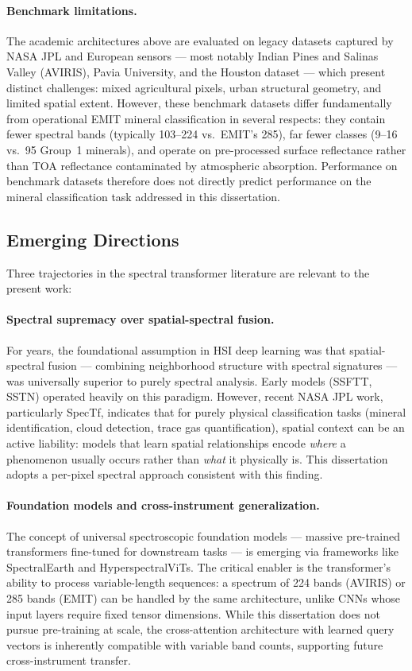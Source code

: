 \documentclass[11pt]{report}
\begin{document}
\paragraph{Benchmark limitations.}
The academic architectures above are evaluated on legacy datasets captured by NASA JPL and European sensors --- most notably Indian Pines and Salinas Valley (AVIRIS), Pavia University, and the Houston dataset --- which present distinct challenges: mixed agricultural pixels, urban structural geometry, and limited spatial extent. However, these benchmark datasets differ fundamentally from operational EMIT mineral classification in several respects: they contain fewer spectral bands (typically 103--224 vs.\ EMIT's 285), far fewer classes (9--16 vs.\ 95 Group~1 minerals), and operate on pre-processed surface reflectance rather than TOA reflectance contaminated by atmospheric absorption. Performance on benchmark datasets therefore does not directly predict performance on the mineral classification task addressed in this dissertation.

\subsection{Emerging Directions}

Three trajectories in the spectral transformer literature are relevant to the present work:

\paragraph{Spectral supremacy over spatial-spectral fusion.}
For years, the foundational assumption in HSI deep learning was that spatial-spectral fusion --- combining neighborhood structure with spectral signatures --- was universally superior to purely spectral analysis. Early models (SSFTT, SSTN) operated heavily on this paradigm. However, recent NASA JPL work, particularly SpecTf, indicates that for purely physical classification tasks (mineral identification, cloud detection, trace gas quantification), spatial context can be an active liability: models that learn spatial relationships encode \emph{where} a phenomenon usually occurs rather than \emph{what} it physically is. This dissertation adopts a per-pixel spectral approach consistent with this finding.

\paragraph{Foundation models and cross-instrument generalization.}
The concept of universal spectroscopic foundation models --- massive pre-trained transformers fine-tuned for downstream tasks --- is emerging via frameworks like SpectralEarth and HyperspectralViTs. The critical enabler is the transformer's ability to process variable-length sequences: a spectrum of 224 bands (AVIRIS) or 285 bands (EMIT) can be handled by the same architecture, unlike CNNs whose input layers require fixed tensor dimensions. While this dissertation does not pursue pre-training at scale, the cross-attention architecture with learned query vectors is inherently compatible with variable band counts, supporting future cross-instrument transfer.
\end{document}
